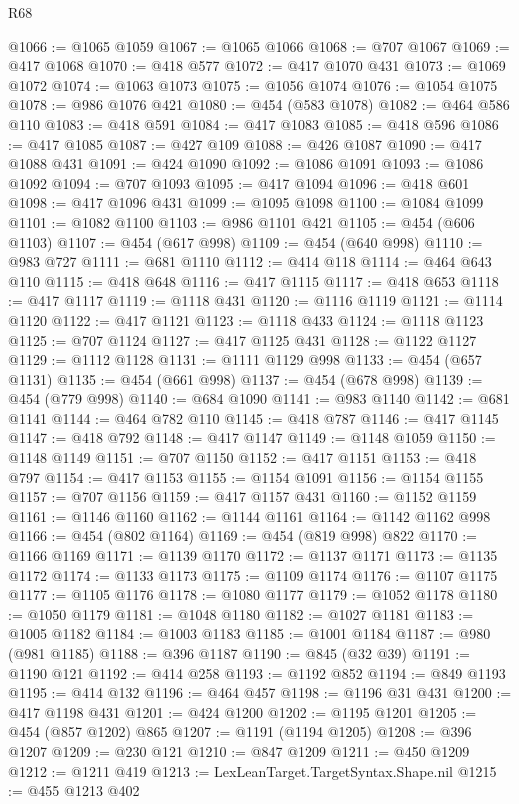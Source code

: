 \begin{lexlean}{R68}
\begin{coremodule}
@1066 := @1065 @1059
@1067 := @1065 @1066
@1068 := @707 @1067
@1069 := @417 @1068
@1070 := @418 @577
@1072 := @417 @1070 @431
@1073 := @1069 @1072
@1074 := @1063 @1073
@1075 := @1056 @1074
@1076 := @1054 @1075
@1078 := @986 @1076 @421
@1080 := @454 (@583 @1078)
@1082 := @464 @586 @110
@1083 := @418 @591
@1084 := @417 @1083
@1085 := @418 @596
@1086 := @417 @1085
@1087 := @427 @109
@1088 := @426 @1087
@1090 := @417 @1088 @431
@1091 := @424 @1090
@1092 := @1086 @1091
@1093 := @1086 @1092
@1094 := @707 @1093
@1095 := @417 @1094
@1096 := @418 @601
@1098 := @417 @1096 @431
@1099 := @1095 @1098
@1100 := @1084 @1099
@1101 := @1082 @1100
@1103 := @986 @1101 @421
@1105 := @454 (@606 @1103)
@1107 := @454 (@617 @998)
@1109 := @454 (@640 @998)
@1110 := @983 @727
@1111 := @681 @1110
@1112 := @414 @118
@1114 := @464 @643 @110
@1115 := @418 @648
@1116 := @417 @1115
@1117 := @418 @653
@1118 := @417 @1117
@1119 := @1118 @431
@1120 := @1116 @1119
@1121 := @1114 @1120
@1122 := @417 @1121
@1123 := @1118 @433
@1124 := @1118 @1123
@1125 := @707 @1124
@1127 := @417 @1125 @431
@1128 := @1122 @1127
@1129 := @1112 @1128
@1131 := @1111 @1129 @998
@1133 := @454 (@657 @1131)
@1135 := @454 (@661 @998)
@1137 := @454 (@678 @998)
@1139 := @454 (@779 @998)
@1140 := @684 @1090
@1141 := @983 @1140
@1142 := @681 @1141
@1144 := @464 @782 @110
@1145 := @418 @787
@1146 := @417 @1145
@1147 := @418 @792
@1148 := @417 @1147
@1149 := @1148 @1059
@1150 := @1148 @1149
@1151 := @707 @1150
@1152 := @417 @1151
@1153 := @418 @797
@1154 := @417 @1153
@1155 := @1154 @1091
@1156 := @1154 @1155
@1157 := @707 @1156
@1159 := @417 @1157 @431
@1160 := @1152 @1159
@1161 := @1146 @1160
@1162 := @1144 @1161
@1164 := @1142 @1162 @998
@1166 := @454 (@802 @1164)
@1169 := @454 (@819 @998) @822
@1170 := @1166 @1169
@1171 := @1139 @1170
@1172 := @1137 @1171
@1173 := @1135 @1172
@1174 := @1133 @1173
@1175 := @1109 @1174
@1176 := @1107 @1175
@1177 := @1105 @1176
@1178 := @1080 @1177
@1179 := @1052 @1178
@1180 := @1050 @1179
@1181 := @1048 @1180
@1182 := @1027 @1181
@1183 := @1005 @1182
@1184 := @1003 @1183
@1185 := @1001 @1184
@1187 := @980 (@981 @1185)
@1188 := @396 @1187
@1190 := @845 (@32 @39)
@1191 := @1190 @121
@1192 := @414 @258
@1193 := @1192 @852
@1194 := @849 @1193
@1195 := @414 @132
@1196 := @464 @457
@1198 := @1196 @31 @431
@1200 := @417 @1198 @431
@1201 := @424 @1200
@1202 := @1195 @1201
@1205 := @454 (@857 @1202) @865
@1207 := @1191 (@1194 @1205)
@1208 := @396 @1207
@1209 := @230 @121
@1210 := @847 @1209
@1211 := @450 @1209
@1212 := @1211 @419
@1213 := LexLeanTarget.TargetSyntax.Shape.nil
@1215 := @455 @1213 @402

\end{coremodule}
\end{lexlean}
